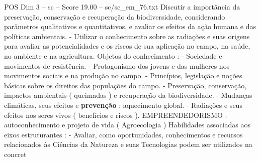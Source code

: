 \begin{textsample}{POS Dim 3 – sc – Score 19.00 – sc/sc\_em\_76.txt}
Discutir a importância da preservação, conservação e recuperação da biodiversidade, considerando parâmetros qualitativos e quantitativos, e avaliar os efeitos da ação humana e das políticas ambientais. - Utilizar o conhecimento sobre as radiações e suas origens para avaliar as potencialidades e os riscos de sua aplicação no campo, na saúde, no ambiente e na agricultura.
Objetos do conhecimento : - Sociedade e movimentos de resistência. - Protagonismo dos jovens e das mulheres nos movimentos sociais e na produção no campo. - Princípios, legislação e noções básicas sobre os direitos das populações do campo. - Preservação, conservação, impactos ambientais ( queimadas ) e recuperação da biodiversidade. - Mudanças climáticas, seus efeitos e \textbf{prevenção} : aquecimento global. - Radiações e seus efeitos nos seres vivos ( benefícios e riscos ).
EMPREENDEDORISMO : autoconhecimento e projeto de vida ( Agroecologia ) Habilidades associadas aos eixos estruturantes : - Avaliar, como oportunidades, conhecimentos e recursos relacionados às Ciências da Natureza e suas Tecnologias podem ser utilizados na concret

\end{textsample}
